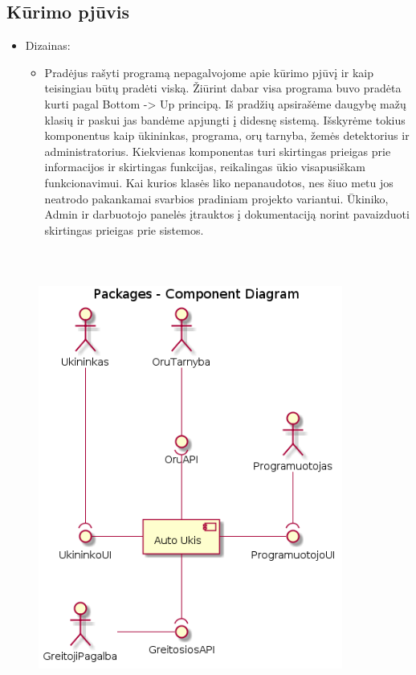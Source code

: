 \documentclass[oneside]{VUMIFPSkursinis}
\begin{document}
\subsection{Kūrimo pjūvis}
\begin{itemize}
\item Dizainas: 
		\begin{itemize}
			\item Pradėjus rašyti programą nepagalvojome apie kūrimo pjūvį ir kaip teisingiau būtų pradėti viską. Žiūrint dabar visa programa buvo pradėta kurti pagal Bottom -> Up principą. Iš pradžių apsirašėme daugybę mažų klasių ir paskui jas bandėme apjungti į didesnę sistemą. Išskyrėme tokius komponentus kaip ūkininkas, programa, orų tarnyba, žemės detektorius ir administratorius. Kiekvienas komponentas turi skirtingas prieigas prie informacijos ir skirtingas funkcijas, reikalingas ūkio visapusiškam funkcionavimui. Kai kurios klasės liko nepanaudotos, nes šiuo metu jos neatrodo pakankamai svarbios pradiniam projekto variantui. Ūkiniko, Admin ir darbuotojo panelės įtrauktos į dokumentaciją norint pavaizduoti skirtingas prieigas prie sistemos.
		\end{itemize}
		\end{itemize}
\begin{figure}[H]
\centering	
\includegraphics[width=10cm,height=15cm,keepaspectratio]{l0.png}	
\caption{}
\label{fig:l0}
\end{figure}
\end{document}
